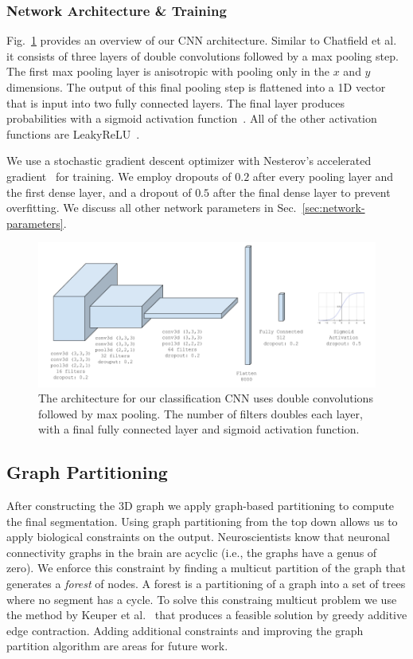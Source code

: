 \subsubsection{Network Architecture \& Training}

Fig.~\ref{fig:architecture} provides an overview of our CNN architecture. Similar to Chatfield et al.~\cite{chatfield2014return} it consists of three layers of double convolutions followed by a max pooling step. The first max pooling layer is anisotropic with pooling only in the $x$ and $y$ dimensions. The output of this final pooling step is flattened into a 1D vector that is input into two fully connected layers. The final layer produces probabilities with a sigmoid activation function~\cite{funahashi1989approximate}. All of the other activation functions are LeakyReLU~\cite{maas2013rectifier}.

We use a stochastic gradient descent optimizer with Nesterov's accelerated gradient~\cite{nesterov1983method} for training. We employ dropouts of $0.2$ after every pooling layer and the first dense layer, and a dropout of $0.5$ after the final dense layer to prevent overfitting. We discuss all other network parameters in Sec.~\ref{sec:network-parameters}.

\begin{figure}[t]
	\centering
	\includegraphics[width=0.95\linewidth]{figures/architecture.png}
	\caption{The architecture for our classification CNN uses double convolutions followed by max pooling. The number of filters doubles each layer, with a final fully connected layer and sigmoid activation function.}
	\label{fig:architecture}
\end{figure}

\subsection{Graph Partitioning}

After constructing the 3D graph we apply graph-based partitioning to compute the final segmentation. Using graph partitioning from the top down allows us to apply biological constraints on the output. Neuroscientists know that neuronal connectivity graphs in the brain are acyclic (i.e., the graphs have a genus of zero). We enforce this constraint by finding a multicut partition of the graph that generates a \textit{forest} of nodes. A forest is a partitioning of a graph into a set of trees where no segment has a cycle. To solve this constraing multicut problem we use the method by Keuper et al.~\cite{keuper2015efficient} that produces a feasible solution by greedy additive edge contraction. Adding additional constraints and improving the graph partition algorithm are areas for future work.
